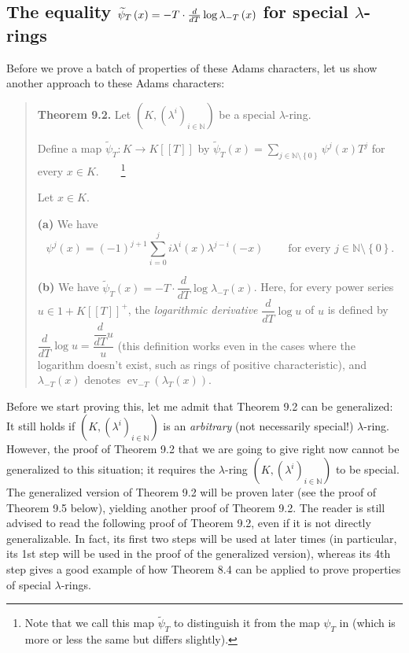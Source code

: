 \documentclass[numbers=enddot,12pt,final,onecolumn,notitlepage]{scrartcl}%
\begin{document}
\subsection{The equality $\protect\widetilde{\psi}_{T}\left(  x\right)  =
-T\cdot\frac{d}{dT}\log\lambda_{-T}\left(  x\right)  $ for special $\lambda
$-rings}

Before we prove a batch of properties of these Adams characters, let us show
another approach to these Adams characters:

\begin{quote}
\textbf{Theorem 9.2.} Let $\left(  K,\left(  \lambda^{i}\right)
_{i\in\mathbb{N}}\right)  $ be a special $\lambda$-ring.

Define a map $\widetilde{\psi}_{T}:K\rightarrow K\left[  \left[  T\right]
\right]  $ by $\widetilde{\psi}_{T}\left(  x\right)  =\sum\limits_{j\in
\mathbb{N}\setminus\left\{  0\right\}  }\psi^{j}\left(  x\right)  T^{j}$ for
every $x\in K$.\ \ \ \ \footnote{Note that we call this map $\widetilde{\psi
}_{T}$ to distinguish it from the map $\psi_{T}$ in \cite{FulLan85} (which is
more or less the same but differs slightly).}

Let $x\in K$.

\textbf{(a)} We have%
\[
\psi^{j}\left(  x\right)  =\left(  -1\right)  ^{j+1}\sum_{i=0}^{j}i\lambda
^{i}\left(  x\right)  \lambda^{j-i}\left(  -x\right)
\ \ \ \ \ \ \ \ \ \ \text{for every }j\in\mathbb{N}\setminus\left\{
0\right\}  \text{.}%
\]


\textbf{(b)} We have $\widetilde{\psi}_{T}\left(  x\right)  =-T\cdot\dfrac
{d}{dT}\log\lambda_{-T}\left(  x\right)  $. Here, for every power series
$u\in1+K\left[  \left[  T\right]  \right]  ^{+}$, the \textit{logarithmic
derivative} $\dfrac{d}{dT}\log u$ of $u$ is defined by $\dfrac{d}{dT}\log
u=\dfrac{\dfrac{d}{dT}u}{u}$ (this definition works even in the cases where
the logarithm doesn't exist, such as rings of positive characteristic), and
$\lambda_{-T}\left(  x\right)  $ denotes $\operatorname*{ev}_{-T}\left(
\lambda_{T}\left(  x\right)  \right)  $.
\end{quote}

Before we start proving this, let me admit that Theorem 9.2 can be
generalized: It still holds if $\left(  K,\left(  \lambda^{i}\right)
_{i\in\mathbb{N}}\right)  $ is an \textit{arbitrary} (not necessarily
special!) $\lambda$-ring. However, the proof of Theorem 9.2 that we are going
to give right now cannot be generalized to this situation; it requires the
$\lambda$-ring $\left(  K,\left(  \lambda^{i}\right)  _{i\in\mathbb{N}%
}\right)  $ to be special. The generalized version of Theorem 9.2 will be
proven later (see the proof of Theorem 9.5 below), yielding another proof of
Theorem 9.2. The reader is still advised to read the following proof of
Theorem 9.2, even if it is not directly generalizable. In fact, its first two
steps will be used at later times (in particular, its 1st step will be used in
the proof of the generalized version), whereas its 4th step gives a good
example of how Theorem 8.4 can be applied to prove properties of special
$\lambda$-rings.
\end{document}
